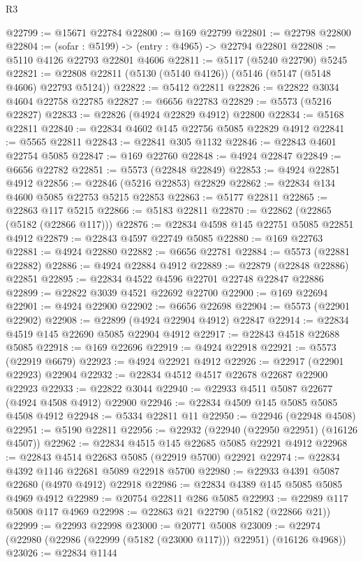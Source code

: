 \begin{lexlean}{R3}
\begin{coremodule}
@22799 := @15671 @22784
@22800 := @169 @22799
@22801 := @22798 @22800
@22804 := (sofar : @5199) -> (entry : @4965) -> @22794 @22801
@22808 := @5110 @4126 @22793 @22801 @4606
@22811 := @5117 (@5240 @22790) @5245
@22821 := @22808 @22811 (@5130 (@5140 @4126)) (@5146 (@5147 (@5148 @4606) @22793 @5124))
@22822 := @5412 @22811
@22826 := @22822 @3034 @4604 @22758 @22785
@22827 := @6656 @22783
@22829 := @5573 (@5216 @22827)
@22833 := @22826 (@4924 @22829 @4912) @22800
@22834 := @5168 @22811
@22840 := @22834 @4602 @145 @22756 @5085 @22829 @4912
@22841 := @5565 @22811
@22843 := @22841 @305 @1132
@22846 := @22843 @4601 @22754 @5085
@22847 := @169 @22760
@22848 := @4924 @22847
@22849 := @6656 @22782
@22851 := @5573 (@22848 @22849)
@22853 := @4924 @22851 @4912
@22856 := @22846 (@5216 @22853) @22829
@22862 := @22834 @134 @4600 @5085 @22753 @5215 @22853
@22863 := @5177 @22811
@22865 := @22863 @117 @5215
@22866 := @5183 @22811
@22870 := @22862 (@22865 (@5182 (@22866 @117)))
@22876 := @22834 @4598 @145 @22751 @5085 @22851 @4912
@22879 := @22843 @4597 @22749 @5085
@22880 := @169 @22763
@22881 := @4924 @22880
@22882 := @6656 @22781
@22884 := @5573 (@22881 @22882)
@22886 := @4924 @22884 @4912
@22889 := @22879 (@22848 @22886) @22851
@22895 := @22834 @4522 @4596 @22701 @22748 @22847 @22886
@22899 := @22822 @3039 @4521 @22692 @22700
@22900 := @169 @22694
@22901 := @4924 @22900
@22902 := @6656 @22698
@22904 := @5573 (@22901 @22902)
@22908 := @22899 (@4924 @22904 @4912) @22847
@22914 := @22834 @4519 @145 @22690 @5085 @22904 @4912
@22917 := @22843 @4518 @22688 @5085
@22918 := @169 @22696
@22919 := @4924 @22918
@22921 := @5573 (@22919 @6679)
@22923 := @4924 @22921 @4912
@22926 := @22917 (@22901 @22923) @22904
@22932 := @22834 @4512 @4517 @22678 @22687 @22900 @22923
@22933 := @22822 @3044
@22940 := @22933 @4511 @5087 @22677 (@4924 @4508 @4912) @22900
@22946 := @22834 @4509 @145 @5085 @5085 @4508 @4912
@22948 := @5334 @22811 @11
@22950 := @22946 (@22948 @4508)
@22951 := @5190 @22811
@22956 := @22932 (@22940 (@22950 @22951) (@16126 @4507))
@22962 := @22834 @4515 @145 @22685 @5085 @22921 @4912
@22968 := @22843 @4514 @22683 @5085 (@22919 @5700) @22921
@22974 := @22834 @4392 @1146 @22681 @5089 @22918 @5700
@22980 := @22933 @4391 @5087 @22680 (@4970 @4912) @22918
@22986 := @22834 @4389 @145 @5085 @5085 @4969 @4912
@22989 := @20754 @22811 @286 @5085
@22993 := @22989 @117 @5008 @117 @4969
@22998 := @22863 @21 @22790 (@5182 (@22866 @21))
@22999 := @22993 @22998
@23000 := @20771 @5008
@23009 := @22974 (@22980 (@22986 (@22999 (@5182 (@23000 @117))) @22951) (@16126 @4968))
@23026 := @22834
    @1144

\end{coremodule}
\end{lexlean}
